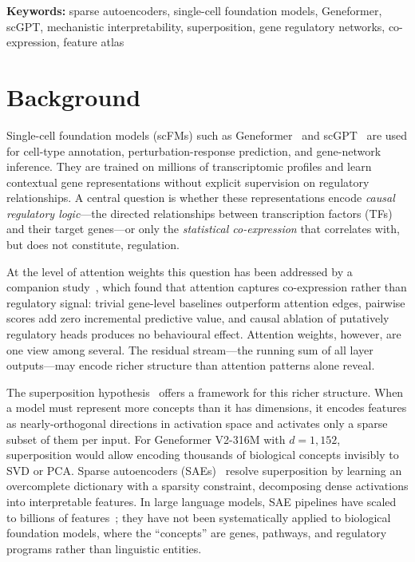 \documentclass[onecolumn]{article}
\begin{document}
\textbf{Keywords:} sparse autoencoders, single-cell foundation models, Geneformer, scGPT, mechanistic interpretability, superposition, gene regulatory networks, co-expression, feature atlas


\section{Background}

Single-cell foundation models (scFMs) such as Geneformer~\cite{theodoris2023transfer} and scGPT~\cite{cui2024scgpt} are used for cell-type annotation, perturbation-response prediction, and gene-network inference. They are trained on millions of transcriptomic profiles and learn contextual gene representations without explicit supervision on regulatory relationships. A central question is whether these representations encode \emph{causal regulatory logic}---the directed relationships between transcription factors (TFs) and their target genes---or only the \emph{statistical co-expression} that correlates with, but does not constitute, regulation.

At the level of attention weights this question has been addressed by a companion study~\cite{kendiukhov2025systematic}, which found that attention captures co-expression rather than regulatory signal: trivial gene-level baselines outperform attention edges, pairwise scores add zero incremental predictive value, and causal ablation of putatively regulatory heads produces no behavioural effect. Attention weights, however, are one view among several. The residual stream---the running sum of all layer outputs---may encode richer structure than attention patterns alone reveal.

The superposition hypothesis~\cite{elhage2022superposition} offers a framework for this richer structure. When a model must represent more concepts than it has dimensions, it encodes features as nearly-orthogonal directions in activation space and activates only a sparse subset of them per input. For Geneformer V2-316M with $d{=}1{,}152$, superposition would allow encoding thousands of biological concepts invisibly to SVD or PCA. Sparse autoencoders (SAEs)~\cite{olshausen1997sparse,sharkey2022taking,cunningham2023sparse,bricken2023monosemanticity} resolve superposition by learning an overcomplete dictionary with a sparsity constraint, decomposing dense activations into interpretable features. In large language models, SAE pipelines have scaled to billions of features~\cite{gao2024scaling,templeton2024scaling}; they have not been systematically applied to biological foundation models, where the ``concepts'' are genes, pathways, and regulatory programs rather than linguistic entities.
\end{document}

